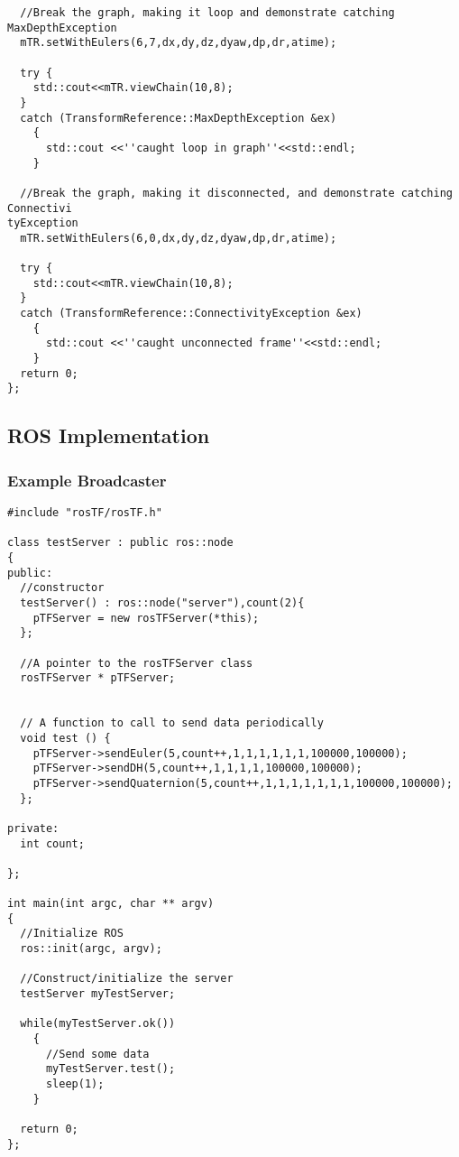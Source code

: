 \documentclass[12pt]{article}
\begin{document}
\begin{verbatim}
  //Break the graph, making it loop and demonstrate catching MaxDepthException
  mTR.setWithEulers(6,7,dx,dy,dz,dyaw,dp,dr,atime);
  
  try {
    std::cout<<mTR.viewChain(10,8);
  }
  catch (TransformReference::MaxDepthException &ex)
    {
      std::cout <<''caught loop in graph''<<std::endl;
    }
  
  //Break the graph, making it disconnected, and demonstrate catching Connectivi
tyException
  mTR.setWithEulers(6,0,dx,dy,dz,dyaw,dp,dr,atime);

  try {
    std::cout<<mTR.viewChain(10,8);
  }
  catch (TransformReference::ConnectivityException &ex)
    {
      std::cout <<''caught unconnected frame''<<std::endl;
    }  
  return 0;
};

\end{verbatim}

\subsection{ROS Implementation}

\subsubsection{Example Broadcaster}
\begin{verbatim}
#include "rosTF/rosTF.h"

class testServer : public ros::node
{
public:
  //constructor
  testServer() : ros::node("server"),count(2){
    pTFServer = new rosTFServer(*this);
  };

  //A pointer to the rosTFServer class
  rosTFServer * pTFServer;


  // A function to call to send data periodically
  void test () {
    pTFServer->sendEuler(5,count++,1,1,1,1,1,1,100000,100000);
    pTFServer->sendDH(5,count++,1,1,1,1,100000,100000);
    pTFServer->sendQuaternion(5,count++,1,1,1,1,1,1,1,100000,100000);
  };

private:
  int count;

};

int main(int argc, char ** argv)
{
  //Initialize ROS
  ros::init(argc, argv);

  //Construct/initialize the server
  testServer myTestServer;
  
  while(myTestServer.ok())
    {
      //Send some data
      myTestServer.test();
      sleep(1);
    }

  return 0;
};
\end{verbatim}
\end{document}
